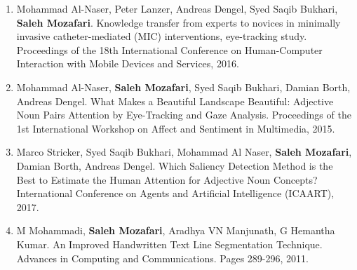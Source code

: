 \begin{enumerate}
	\item Mohammad Al-Naser, Peter Lanzer, Andreas Dengel, Syed Saqib Bukhari, \textbf{Saleh Mozafari}.  Knowledge transfer from experts to novices in minimally invasive catheter-mediated (MIC) interventions, eye-tracking study. Proceedings of the 18th International Conference on Human-Computer Interaction with Mobile Devices and Services, 2016.
	\item Mohammad Al-Naser, \textbf{Saleh Mozafari}, Syed Saqib Bukhari, Damian Borth, Andreas Dengel. What Makes a Beautiful Landscape Beautiful: Adjective Noun Pairs Attention by Eye-Tracking and Gaze Analysis. Proceedings of the 1st International Workshop on Affect and Sentiment in Multimedia, 2015.
	\item Marco Stricker, Syed Saqib Bukhari, Mohammad Al Naser, \textbf{Saleh Mozafari}, Damian Borth, Andreas Dengel.  Which Saliency Detection Method is the Best to Estimate the Human Attention for Adjective Noun Concepts? International Conference on Agents and Artificial Intelligence (ICAART), 2017.
	\item M Mohammadi, \textbf{Saleh Mozafari}, Aradhya VN Manjunath, G Hemantha Kumar. An Improved Handwritten Text Line Segmentation Technique. Advances in Computing and Communications. Pages 289-296, 2011.
\end{enumerate}

